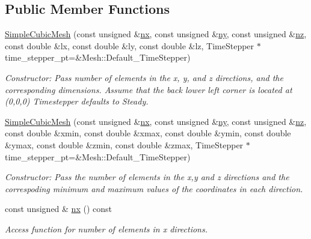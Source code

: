 \subsection*{Public Member Functions}
\begin{DoxyCompactItemize}
\item 
\hyperlink{classoomph_1_1SimpleCubicMesh_a6732b9fc1cd2e98929158fc300b5b0c7}{Simple\+Cubic\+Mesh} (const unsigned \&\hyperlink{classoomph_1_1SimpleCubicMesh_ad29c917ec0adb29ad24e086e3dcd0b6f}{nx}, const unsigned \&\hyperlink{classoomph_1_1SimpleCubicMesh_a16979ec3b0e88fb37730415190021c1c}{ny}, const unsigned \&\hyperlink{classoomph_1_1SimpleCubicMesh_ad78725440e4e87598fd9339653b28e61}{nz}, const double \&lx, const double \&ly, const double \&lz, Time\+Stepper $\ast$time\+\_\+stepper\+\_\+pt=\&Mesh\+::\+Default\+\_\+\+Time\+Stepper)
\begin{DoxyCompactList}\small\item\em Constructor\+: Pass number of elements in the x, y, and z directions, and the corresponding dimensions. Assume that the back lower left corner is located at (0,0,0) Timestepper defaults to Steady. \end{DoxyCompactList}\item 
\hyperlink{classoomph_1_1SimpleCubicMesh_a22d32a0d85ab3ec9ac3e52cad0bb81d7}{Simple\+Cubic\+Mesh} (const unsigned \&\hyperlink{classoomph_1_1SimpleCubicMesh_ad29c917ec0adb29ad24e086e3dcd0b6f}{nx}, const unsigned \&\hyperlink{classoomph_1_1SimpleCubicMesh_a16979ec3b0e88fb37730415190021c1c}{ny}, const unsigned \&\hyperlink{classoomph_1_1SimpleCubicMesh_ad78725440e4e87598fd9339653b28e61}{nz}, const double \&xmin, const double \&xmax, const double \&ymin, const double \&ymax, const double \&zmin, const double \&zmax, Time\+Stepper $\ast$time\+\_\+stepper\+\_\+pt=\&Mesh\+::\+Default\+\_\+\+Time\+Stepper)
\begin{DoxyCompactList}\small\item\em Constructor\+: Pass the number of elements in the x,y and z directions and the correspoding minimum and maximum values of the coordinates in each direction. \end{DoxyCompactList}\item 
const unsigned \& \hyperlink{classoomph_1_1SimpleCubicMesh_ad29c917ec0adb29ad24e086e3dcd0b6f}{nx} () const
\begin{DoxyCompactList}\small\item\em Access function for number of elements in x directions. \end{DoxyCompactList}\item 

\end{DoxyCompactItemize}
